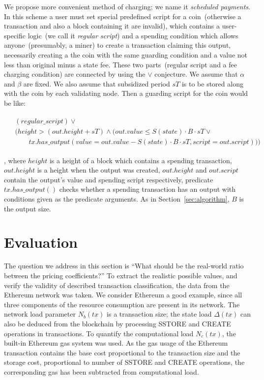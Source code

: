 \documentclass[]{llncs}   %
\begin{document}
We propose more convenient method of charging; we name it {\em scheduled payments}. In this scheme a user must set special predefined script for a coin~(otherwise a transaction and also a block containing it are invalid), which contains a user-specific logic~(we call it {\em regular script}) and a spending condition which allows anyone~(presumably, a miner) to create a transaction claiming this output, necessarily creating a the coin with the same guarding condition and a value not less than original minus a state fee. These two parts~(regular script and a fee charging condition) are connected by using the $\lor$ conjecture. We assume that $\alpha$ and $\beta$ are fixed. We also assume that subsidized period $sT$ is to be stored along with the coin by each validating node. Then a guarding script for the coin would be like:

\begin{align}
\begin{split}
&(regular\_script) \lor \\
&(height > (out.height + sT) \land (out.value \le S(state) \cdot B \cdot sT \lor \\  
&\qquad tx.has\_output(value = out.value - S(state) \cdot B \cdot sT, script = out.script)))
\end{split}
\end{align}

, where $height$ is a height of a block which contains a spending transaction, $out.height$ is a height when the output was created, $out.height$ and $out.script$ contain the output's value and spending script respectively, predicate $tx.has\_output()$ checks whether a spending transaction has an output with conditions given as the predicate arguments. As in Section~\ref{sec:algorithm}, $B$ is the output size.     


\section{Evaluation}
\label{sec:evaluation}

The question we address in this section is ``What should be the real-world
ratio between the pricing coefficients?'' To extract the realistic possible
values, and verify the validity of described transaction classification, the
data from the Ethereum network was taken. We consider Ethereum a good example,
since all three components of the resource consumption are present in its
network. The network load parameter $N_b(tx)$ is a transaction size; the state
load $\Delta(tx)$ can also be deduced from the blockchain by processing SSTORE
and CREATE operations in transactions. To quantify the
computational load $N_c(tx)$, the built-in Ethereum gas system was used. As the
gas usage of the Ethereum transaction contains the base cost proportional to the
transaction size and the storage cost, proportional to number of SSTORE and CREATE
operations, the corresponding gas has been subtracted from computational load.
\end{document}
